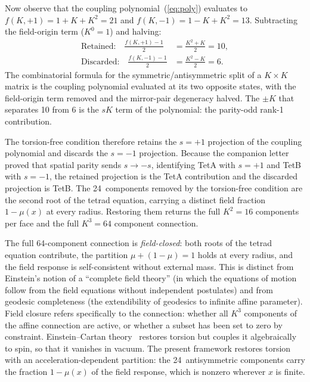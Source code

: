\documentclass[twocolumn]{iopjournal}
\begin{document}
Now observe that the coupling polynomial~(\ref{eq:poly})
evaluates to $f(K,{+}1) = 1 + K + K^2 = 21$ and
$f(K,{-}1) = 1 - K + K^2 = 13$.  Subtracting the
field-origin term ($K^0 = 1$) and halving:
\begin{align}
  \text{Retained:} \quad
    \frac{f(K,{+}1) - 1}{2}
    &= \frac{K^2 + K}{2} = 10,
    \label{eq:poly_kept} \\[6pt]
  \text{Discarded:} \quad
    \frac{f(K,{-}1) - 1}{2}
    &= \frac{K^2 - K}{2} = 6.
    \label{eq:poly_disc}
\end{align}
The combinatorial formula for the symmetric/antisymmetric
split of a $K \times K$ matrix is the coupling polynomial
evaluated at its two opposite states, with the field-origin
term removed and the mirror-pair degeneracy halved.  The
$\pm K$ that separates 10 from 6 is the $sK$ term of the
polynomial: the parity-odd rank-1 contribution.

The torsion-free condition therefore retains the $s = +1$
projection of the coupling polynomial and discards the
$s = -1$ projection.  Because the companion letter proved
that spatial parity sends $s \to -s$, identifying TetA with
$s = +1$ and TetB with $s = -1$, the retained projection is
the TetA contribution and the discarded projection is TetB.
The 24~components removed by the torsion-free condition are
the second root of the tetrad equation, carrying a distinct
field fraction $1 - \mu(x)$ at every radius.  Restoring them
returns the full $K^2 = 16$ components per face and the full
$K^3 = 64$ component connection.

The full 64-component connection is
\textit{field-closed}: both roots of the tetrad equation
contribute, the partition $\mu + (1{-}\mu) = 1$ holds at
every radius, and the field response is self-consistent
without external mass.  This is distinct from Einstein's
notion of a ``complete field theory'' (in which the equations
of motion follow from the field equations without independent
postulates) and from geodesic completeness (the extendibility
of geodesics to infinite affine parameter).  Field closure
refers specifically to the connection: whether all $K^3$
components of the affine connection are active, or whether a
subset has been set to zero by constraint.
Einstein--Cartan theory~\cite{Hehl1976} restores torsion but
couples it algebraically to spin, so that it vanishes in
vacuum.  The present framework restores torsion with an
acceleration-dependent partition: the 24~antisymmetric
components carry the fraction $1 - \mu(x)$ of the field
response, which is nonzero wherever $x$ is finite.
\end{document}
